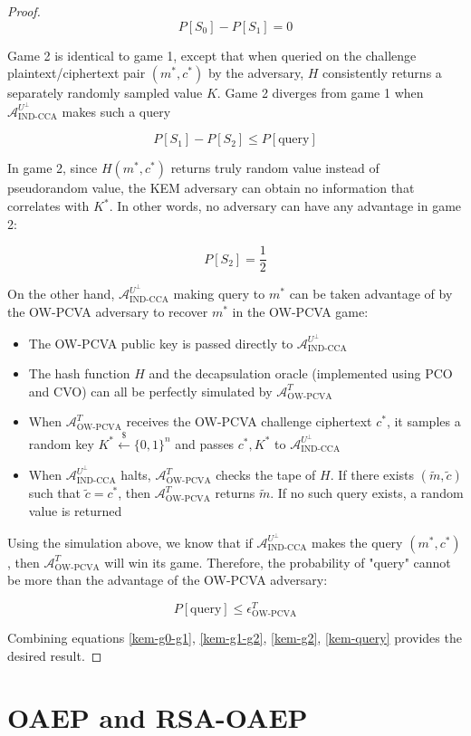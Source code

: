 \documentclass{article}
\newcommand{\leftsample}{\overset{{\scriptscriptstyle\$}}{\leftarrow}}
\begin{document}
\begin{proof}
    \begin{equation}\label{kem-g0-g1}
        P[S_0] - P[S_1] = 0 
    \end{equation}

    Game 2 is identical to game 1, except that when queried on the challenge plaintext/ciphertext pair $(m^\ast, c^\ast)$ by the adversary, $H$ consistently returns a separately randomly sampled value $K$. Game 2 diverges from game 1 when $\mathcal{A}^{U^\bot}_\text{IND-CCA}$ makes such a query
    
    \begin{equation}\label{kem-g1-g2}
        P[S_1] - P[S_2] \leq P[\text{query}]
    \end{equation}

    In game 2, since $H(m^\ast, c^\ast)$ returns truly random value instead of pseudorandom value, the KEM adversary can obtain no information that correlates with $K^\ast$. In other words, no adversary can have any advantage in game 2:

    \begin{equation}\label{kem-g2}
        P[S_2] = \frac{1}{2}
    \end{equation}

    On the other hand, $\mathcal{A}^{U^\bot}_\text{IND-CCA}$ making query to $m^\ast$ can be taken advantage of by the OW-PCVA adversary to recover $m^\ast$ in the OW-PCVA game:

    \begin{itemize}
        \item The OW-PCVA public key is passed directly to $\mathcal{A}^{U^\bot}_\text{IND-CCA}$
        \item The hash function $H$ and the decapsulation oracle (implemented using PCO and CVO) can all be perfectly simulated by $\mathcal{A}^T_\text{OW-PCVA}$
        \item When $\mathcal{A}^T_\text{OW-PCVA}$ receives the OW-PCVA challenge ciphertext $c^\ast$, it samples a random key $K^\ast \leftsample \{0, 1\}^n$ and passes $c^\ast, K^\ast$ to $\mathcal{A}^{U^\bot}_\text{IND-CCA}$
        \item When $\mathcal{A}^{U^\bot}_\text{IND-CCA}$ halts, $\mathcal{A}^T_\text{OW-PCVA}$ checks the tape of $H$. If there exists $(\tilde{m}, \tilde{c})$ such that $\tilde{c} = c^\ast$, then $\mathcal{A}^T_\text{OW-PCVA}$ returns $\tilde{m}$. If no such query exists, a random value is returned
    \end{itemize}

    Using the simulation above, we know that if $\mathcal{A}^{U^\bot}_\text{IND-CCA}$ makes the query $(m^\ast, c^\ast)$, then $\mathcal{A}^T_\text{OW-PCVA}$ will win its game. Therefore, the probability of "query" cannot be more than the advantage of the OW-PCVA adversary:

    \begin{equation}\label{kem-query}
        P[\text{query}] \leq \epsilon^T_\text{OW-PCVA}
    \end{equation}

    Combining equations \ref{kem-g0-g1}, \ref{kem-g1-g2}, \ref{kem-g2}, \ref{kem-query} provides the desired result.
\end{proof}

\section{OAEP and RSA-OAEP}



\end{document}
